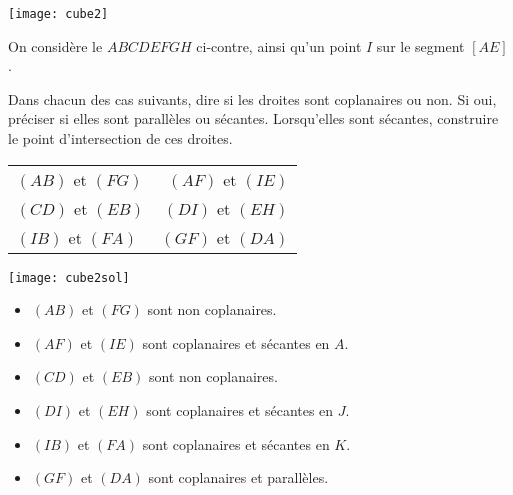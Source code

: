 \documentclass[11pt,fleqn, openany]{book} %
\begin{document}
\begin{exercise}\hspace{0pt}

\begin{minipage}{0.4\linewidth}
\texttt{[image: cube2]}

\end{minipage}\hfill  \begin{minipage}{0.5 \linewidth}
On considère le $ABCDEFGH$ ci-contre, ainsi qu'un point $I$ sur le segment $[AE]$. 

Dans chacun des cas suivants, dire si les droites sont coplanaires ou non. Si oui, préciser si elles sont parallèles ou sécantes. Lorsqu'elles sont sécantes, construire le point d'intersection de ces droites.
\begin{center}
\begin{tabular}{lr}
 $(AB)$ et $(FG)$ & $(AF)$ et $(IE)$  \\
 $(CD)$ et $(EB)$ &  $(DI)$ et $(EH)$ \\
 $(IB)$ et $(FA)$ & $(GF)$ et $(DA)$
\end{tabular}
\end{center}\end{minipage}
\end{exercise}

\begin{solution}\hspace{0pt}

\begin{minipage}{0.3\linewidth}
\texttt{[image: cube2sol]}

\end{minipage}\hfill  \begin{minipage}{0.65 \linewidth}

\begin{itemize}
\item $(AB)$ et $(FG)$ sont non coplanaires.
\item  $(AF)$ et $(IE)$  sont coplanaires et sécantes en $A$.
\item $(CD)$ et $(EB)$ sont non coplanaires.
\item  $(DI)$ et $(EH)$ sont coplanaires et sécantes en $J$.
\item $(IB)$ et $(FA)$ sont coplanaires et sécantes en $K$.
\item $(GF)$ et $(DA)$ sont coplanaires et parallèles.
\end{itemize}
\end{minipage}
\end{solution}
\end{document}

